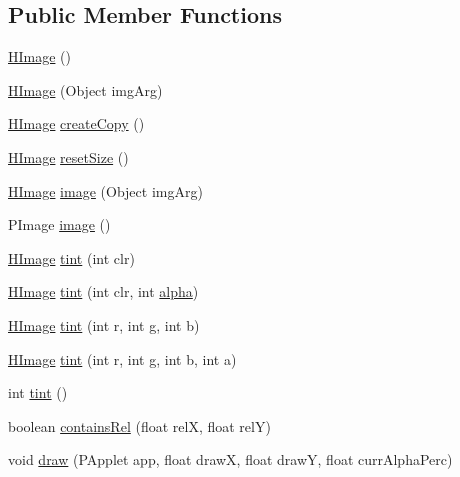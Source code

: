 \subsection*{Public Member Functions}
\begin{DoxyCompactItemize}
\item 
\hyperlink{classhype_1_1drawable_1_1_h_image_a87fd8f91479e552ccd9044c4012fae96}{H\-Image} ()
\item 
\hyperlink{classhype_1_1drawable_1_1_h_image_a36b711117f122c98e90ca69333fac647}{H\-Image} (Object img\-Arg)
\item 
\hyperlink{classhype_1_1drawable_1_1_h_image}{H\-Image} \hyperlink{classhype_1_1drawable_1_1_h_image_ab6908e86219c02c5f48f92bf9300eba9}{create\-Copy} ()
\item 
\hyperlink{classhype_1_1drawable_1_1_h_image}{H\-Image} \hyperlink{classhype_1_1drawable_1_1_h_image_ad4c1133fc8f5075e901a573e240d896e}{reset\-Size} ()
\item 
\hyperlink{classhype_1_1drawable_1_1_h_image}{H\-Image} \hyperlink{classhype_1_1drawable_1_1_h_image_aa134e49466b848b5edb764d1e6e4ae52}{image} (Object img\-Arg)
\item 
P\-Image \hyperlink{classhype_1_1drawable_1_1_h_image_a5e7a802a38cfa64e9f1b65a690da5c87}{image} ()
\item 
\hyperlink{classhype_1_1drawable_1_1_h_image}{H\-Image} \hyperlink{classhype_1_1drawable_1_1_h_image_abb24b279dbca979748164ea41d718b94}{tint} (int clr)
\item 
\hyperlink{classhype_1_1drawable_1_1_h_image}{H\-Image} \hyperlink{classhype_1_1drawable_1_1_h_image_a90ddb7283518bb1716f542e7fb81be85}{tint} (int clr, int \hyperlink{classhype_1_1drawable_1_1_h_drawable_a03c7275f5caab5cc9034b18d4c2f1305}{alpha})
\item 
\hyperlink{classhype_1_1drawable_1_1_h_image}{H\-Image} \hyperlink{classhype_1_1drawable_1_1_h_image_ab1f3b794734b3bf69a8ae730cb341f49}{tint} (int r, int g, int b)
\item 
\hyperlink{classhype_1_1drawable_1_1_h_image}{H\-Image} \hyperlink{classhype_1_1drawable_1_1_h_image_a5a3f54f38e840c9ea82f00e7e4dd6467}{tint} (int r, int g, int b, int a)
\item 
int \hyperlink{classhype_1_1drawable_1_1_h_image_adf558fb9f12c04e7de5b345f8d7a00c7}{tint} ()
\item 
boolean \hyperlink{classhype_1_1drawable_1_1_h_image_a115ff4218c705ab812aa91c0a5c0ba40}{contains\-Rel} (float rel\-X, float rel\-Y)
\item 
void \hyperlink{classhype_1_1drawable_1_1_h_image_aadc15a39c5446530efa9832098007b02}{draw} (P\-Applet app, float draw\-X, float draw\-Y, float curr\-Alpha\-Perc)
\end{DoxyCompactItemize}
